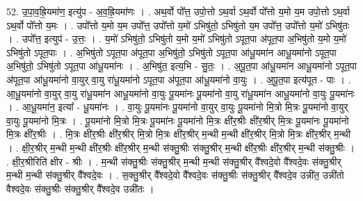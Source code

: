 \documentclass[17pt]{extarticle}
\begin{document}
52. उ॒पा॒व॒ह्रि॒यमा॑ण॒ इत्यु॑प - अ॒व॒ह्रि॒यमा॑णः । . अथ॒र्वो पो᳚त्त॒ उपो॒त्तो ऽथ॒र्वा ऽथ॒र्वो पो᳚त्तो य॒मो य॒म उपो॒त्तो ऽथ॒र्वा ऽथ॒र्वो पो᳚त्तो य॒मः । . उपो᳚त्तो य॒मो य॒म उपो᳚त्त॒ उपो᳚त्तो य॒मो॑ ऽभिषु॑तो॒ ऽभिषु॑तो य॒म उपो᳚त्त॒ उपो᳚त्तो य॒मो॑ ऽभिषु॑तः । . उपो᳚त्त॒ इत्युप॑ - उ॒त्तः॒ । . य॒मो॑ ऽभिषु॑तो॒ ऽभिषु॑तो य॒मो य॒मो॑ ऽभिषु॑तो ऽपूत॒पा अ॑पूत॒पा अ॒भिषु॑तो य॒मो य॒मो॑ ऽभिषु॑तो ऽपूत॒पाः । . अ॒भिषु॑तो ऽपूत॒पा अ॑पूत॒पा अ॒भिषु॑तो॒ ऽभिषु॑तो ऽपूत॒पा आ॑धू॒यमा॑न आधू॒यमा॑नो ऽपूत॒पा अ॒भिषु॑तो॒ ऽभिषु॑तो ऽपूत॒पा आ॑धू॒यमा॑नः । . अ॒भिषु॑त॒ इत्य॒भि - सु॒तः॒ । . अ॒पू॒त॒पा आ॑धू॒यमा॑न आधू॒यमा॑नो ऽपूत॒पा अ॑पूत॒पा आ॑धू॒यमा॑नो वा॒युर् वा॒यु रा॑धू॒यमा॑नो ऽपूत॒पा अ॑पूत॒पा आ॑धू॒यमा॑नो वा॒युः । . अ॒पू॒त॒पा इत्य॑पूत - पाः । . आ॒धू॒यमा॑नो वा॒युर् वा॒यु रा॑धू॒यमा॑न आधू॒यमा॑नो वा॒युः पू॒यमा॑नः पू॒यमा॑नो वा॒यु रा॑धू॒यमा॑न आधू॒यमा॑नो वा॒युः पू॒यमा॑नः । . आ॒धू॒यमा॑न॒ इत्या᳚ - धू॒यमा॑नः । . वा॒युः पू॒यमा॑नः पू॒यमा॑नो वा॒युर् वा॒युः पू॒यमा॑नो मि॒त्रो मि॒त्रः पू॒यमा॑नो वा॒युर् वा॒युः पू॒यमा॑नो मि॒त्रः । . पू॒यमा॑नो मि॒त्रो मि॒त्रः पू॒यमा॑नः पू॒यमा॑नो मि॒त्रः क्षी॑र॒श्रीः क्षी॑र॒श्रीर् मि॒त्रः पू॒यमा॑नः पू॒यमा॑नो मि॒त्रः क्षी॑र॒श्रीः । . मि॒त्रः क्षी॑र॒श्रीः क्षी॑र॒श्रीर् मि॒त्रो मि॒त्रः क्षी॑र॒श्रीर् म॒न्थी म॒न्थी क्षी॑र॒श्रीर् मि॒त्रो मि॒त्रः क्षी॑र॒श्रीर् म॒न्थी । . क्षी॒र॒श्रीर् म॒न्थी म॒न्थी क्षी॑र॒श्रीः क्षी॑र॒श्रीर् म॒न्थी स॑क्तु॒श्रीः स॑क्तु॒श्रीर् म॒न्थी क्षी॑र॒श्रीः क्षी॑र॒श्रीर् म॒न्थी स॑क्तु॒श्रीः । . क्षी॒र॒श्रीरिति॑ क्षीर - श्रीः । . म॒न्थी स॑क्तु॒श्रीः स॑क्तु॒श्रीर् म॒न्थी म॒न्थी स॑क्तु॒श्रीर् वै᳚श्वदे॒वो वै᳚श्वदे॒वः स॑क्तु॒श्रीर् म॒न्थी म॒न्थी स॑क्तु॒श्रीर् वै᳚श्वदे॒वः । . स॒क्तु॒श्रीर् वै᳚श्वदे॒वो वै᳚श्वदे॒वः स॑क्तु॒श्रीः स॑क्तु॒श्रीर् वै᳚श्वदे॒व उन्नी॑त॒ उन्नी॑तो वैश्वदे॒वः स॑क्तु॒श्रीः स॑क्तु॒श्रीर् वै᳚श्वदे॒व उन्नी॑तः । \newline
\end{document}
